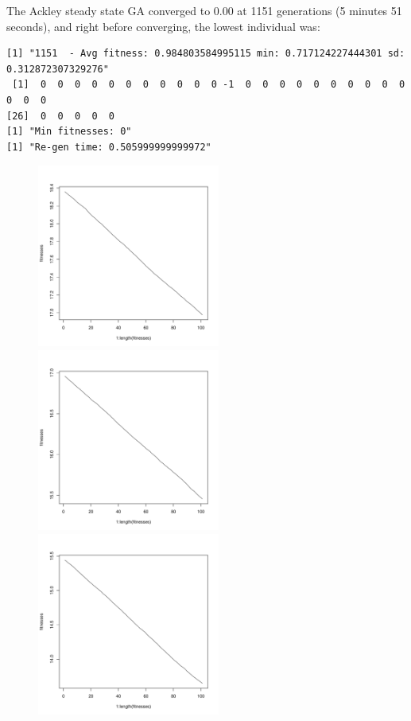 \documentclass[12pt]{article}
\begin{document}
The Ackley steady state GA converged to 0.00 at 1151 generations (5 minutes 51 seconds), and right before converging, the lowest individual was:
\scriptsize
\begin{lstlisting}
[1] "1151  - Avg fitness: 0.984803584995115 min: 0.717124227444301 sd: 0.312872307329276"
 [1]  0  0  0  0  0  0  0  0  0  0  0 -1  0  0  0  0  0  0  0  0  0  0  0  0  0
[26]  0  0  0  0  0
[1] "Min fitnesses: 0"
[1] "Re-gen time: 0.505999999999972"
\end{lstlisting}
\normalsize

\pagebreak

\begin{figure}[!h]
        \begin{center}
		\includegraphics[width=60mm]{images/ackley.ss/avg_202.pdf}
		\includegraphics[width=60mm]{images/ackley.ss/avg_303.pdf}
		\includegraphics[width=60mm]{images/ackley.ss/avg_404.pdf}

\end{center}
\end{figure}
\end{document}
